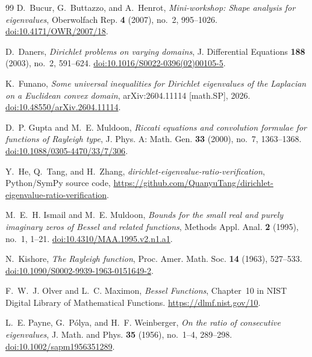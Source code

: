 \documentclass[11pt,letterpaper,reqno]{amsart}
\theoremstyle{definition}
\begin{document}
\begin{thebibliography}{99}
D.~Bucur, G.~Buttazzo, and A.~Henrot,
\emph{Mini-workshop: Shape analysis for eigenvalues},
Oberwolfach Rep. \textbf{4} (2007), no.~2, 995--1026.
\href{https://doi.org/10.4171/OWR/2007/18}
{doi:10.4171/OWR/2007/18}.

D.~Daners,
\emph{Dirichlet problems on varying domains},
J. Differential Equations \textbf{188} (2003), no.~2, 591--624.
\href{https://doi.org/10.1016/S0022-0396(02)00105-5}{doi:10.1016/S0022-0396(02)00105-5}.

K.~Funano,
\emph{Some universal inequalities for Dirichlet eigenvalues of the Laplacian
on a Euclidean convex domain},
arXiv:2604.11114 [math.SP], 2026.
\href{https://doi.org/10.48550/arXiv.2604.11114}
{doi:10.48550/arXiv.2604.11114}.

D.~P. Gupta and M.~E. Muldoon,
\emph{Riccati equations and convolution formulae for functions of Rayleigh type},
J. Phys. A: Math. Gen. \textbf{33} (2000), no.~7, 1363--1368.
\href{https://doi.org/10.1088/0305-4470/33/7/306}
{doi:10.1088/0305-4470/33/7/306}.

Y.~He, Q.~Tang, and H.~Zhang,
\emph{dirichlet-eigenvalue-ratio-verification},
Python/SymPy source code,
\url{https://github.com/QuanyuTang/dirichlet-eigenvalue-ratio-verification}.

M.~E.~H. Ismail and M.~E. Muldoon,
\emph{Bounds for the small real and purely imaginary zeros of Bessel and
related functions},
Methods Appl. Anal. \textbf{2} (1995), no.~1, 1--21.
\href{https://doi.org/10.4310/MAA.1995.v2.n1.a1}
{doi:10.4310/MAA.1995.v2.n1.a1}.

N.~Kishore,
\emph{The Rayleigh function},
Proc. Amer. Math. Soc. \textbf{14} (1963), 527--533.
\href{https://doi.org/10.1090/S0002-9939-1963-0151649-2}
{doi:10.1090/S0002-9939-1963-0151649-2}.


F.~W.~J. Olver and L.~C. Maximon,
\emph{Bessel Functions}, Chapter~10 in
NIST Digital Library of Mathematical Functions.
\url{https://dlmf.nist.gov/10}.

L.~E. Payne, G.~P\'olya, and H.~F. Weinberger,
\emph{On the ratio of consecutive eigenvalues},
J. Math. and Phys. \textbf{35} (1956), no.~1--4, 289--298.
\href{https://doi.org/10.1002/sapm1956351289}
{doi:10.1002/sapm1956351289}.



\end{thebibliography}
\end{document}
